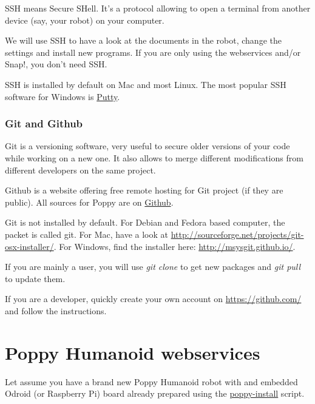 \documentclass{article}
\begin{document}
SSH means Secure SHell. It's a protocol allowing to open a terminal from another device (say, your robot) on your computer.

We will use SSH to have a look at the documents in the robot, change the settings and install new programs. If you are only using the webservices and/or Snap!, you don't need SSH.

SSH is installed by default on Mac and most Linux. The most popular SSH software for Windows is \href{http://www.putty.org/}{Putty}.

\subsubsection{Git and Github}

Git is a versioning software, very useful to secure older versions of your code while working on a new one. It also allows to merge different modifications from different developers on the same project.

Github is a website offering free remote hosting for Git project (if they are public). All sources for Poppy are on \href{https://github.com/poppy-project}{Github}.

Git is not installed by default. For Debian and Fedora based computer, the packet is called git. For Mac, have a look at \url{http://sourceforge.net/projects/git-osx-installer/}. For Windows, find the installer here: \url{http://msysgit.github.io/}.

If you are mainly a user, you will use \textit{git clone} to get new packages and \textit{git pull} to update them.

If you are a developer, quickly create your own account on \url{https://github.com/} and follow the instructions.



\section{Poppy Humanoid webservices}
\label{poppy-webservices}

Let assume you have a brand new Poppy Humanoid robot with and embedded Odroid (or Raspberry Pi) board already prepared using the \href{https://github.com/poppy-project/poppy_install}{poppy-install} script.
\end{document}
